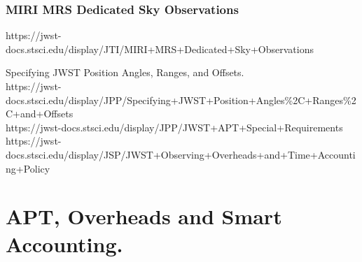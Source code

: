         \subsubsection{MIRI MRS Dedicated Sky Observations}
        https://jwst-docs.stsci.edu/display/JTI/MIRI+MRS+Dedicated+Sky+Observations


%


\smallskip \smallskip
\noindent
Specifying JWST Position Angles, Ranges, and Offsets.\\
https://jwst-docs.stsci.edu/display/JPP/Specifying+JWST+Position+Angles\%2C+Ranges\%2C+and+Offsets\\
https://jwst-docs.stsci.edu/display/JPP/JWST+APT+Special+Requirements\\
https://jwst-docs.stsci.edu/display/JSP/JWST+Observing+Overheads+and+Time+Accounting+Policy\\


\section{APT, Overheads and Smart Accounting.}





